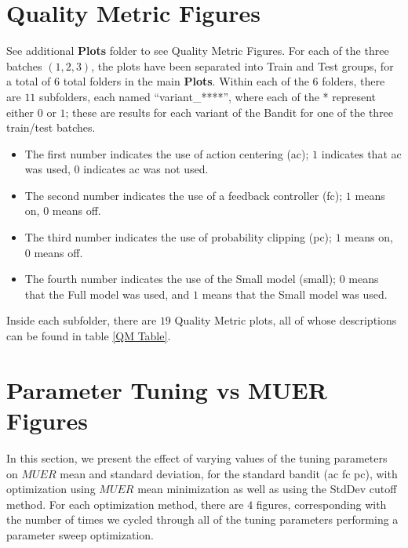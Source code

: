 \clearpage

\section{Quality Metric Figures}
\label{Quality Metric Figures}

See additional {\bf Plots} folder to see Quality Metric Figures.  For each of the three batches $(1,2,3)$, the plots have been separated into Train and Test groups, for a total of $6$ total folders in the main {\bf Plots}.  Within each of the $6$ folders, there are $11$ subfolders, each named ``variant\_****'', where each of the * represent either $0$ or $1$; these are results for each variant of the Bandit for one of the three train/test batches.

\begin{itemize}
	\item The first number indicates the use of action centering (ac); $1$ indicates that ac was used, $0$ indicates ac was not used.
	\item The second number indicates the use of a feedback controller (fc); $1$ means on, $0$ means off.
	\item The third number indicates the use of probability clipping (pc); $1$ means on, $0$ means off.
	\item The fourth number indicates the use of the Small model (small); $0$ means that the Full model was used, and $1$ means that the Small model was used.
\end{itemize}

Inside each subfolder, there are $19$ Quality Metric plots, all of whose descriptions can be found in table \ref{QM Table}.



\section{Parameter Tuning vs MUER Figures}



In this section, we present the effect of varying values of the tuning parameters on $MUER$ mean and standard deviation, for the standard bandit (ac fc pc), with optimization using $MUER$ mean minimization as well as using the StdDev cutoff method.  For each optimization method, there are $4$ figures, corresponding with the number of times we cycled through all of the tuning parameters performing a parameter sweep optimization.  \\

